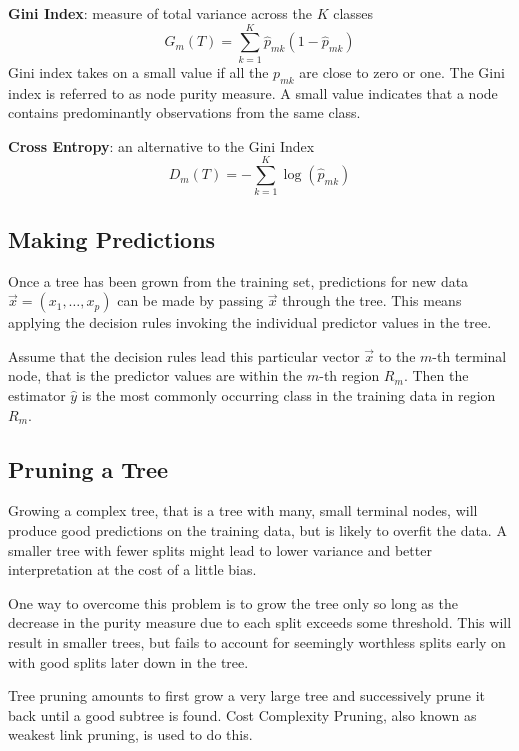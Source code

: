\documentclass[11pt]{article}
\begin{document}
\vspace{1em}
\noindent
\textbf{Gini Index}: measure of total variance across the $K$ classes 
\begin{equation*}
	G_m(T) = \sum_{k=1}^{K} \hat{p}_{mk} (1 - \hat{p}_{mk})
\end{equation*}
Gini index takes on a small value if all the $p_{mk}$ are close to zero or one. The Gini index is referred to as node purity measure. A small value indicates that a node contains predominantly observations from the same class.

\vspace{1em}
\noindent
\textbf{Cross Entropy}: an alternative to the Gini Index
\begin{equation*}
	D_m(T) = -\sum_{k=1}^{K} \log(\hat{p}_{mk})
\end{equation*}

\subsection{Making Predictions}
Once a tree has been grown from the training set, predictions for new data $\vec{x} = (x_1, \dots, x_p)$ can be made by passing $\vec{x}$ through the tree. This means applying the decision rules invoking the individual predictor values in the tree.

Assume that the decision rules lead this particular vector $\vec{x}$ to the $m$-th terminal node, that is the predictor values are within the $m$-th region $R_m$. Then the estimator $\hat{y}$ is the most commonly occurring class in the training data in region $R_m$.

\subsection{Pruning a Tree}
Growing a complex tree, that is a tree with many, small terminal nodes, will produce good predictions on the training data, but is likely to overfit the data. A smaller tree with fewer splits might lead to lower variance and better interpretation at the cost of a little bias.

One way to overcome this problem is to grow the tree only so long as the decrease in the purity measure due to each split exceeds some threshold. This will result in smaller trees, but fails to account for seemingly worthless splits early on with good splits later down in the tree.

Tree pruning amounts to first grow a very large tree and successively prune it back until a good subtree is found. Cost Complexity Pruning, also known as weakest link pruning, is used to do this.
\end{document}
